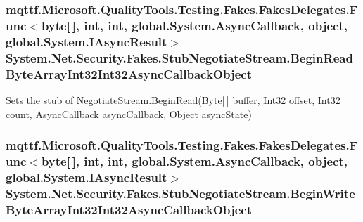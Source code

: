 \hypertarget{class_system_1_1_net_1_1_security_1_1_fakes_1_1_stub_negotiate_stream_a8e59a06ff3bde15658924f7dad554abf}{
\subsubsection[{Begin\-Read\-Byte\-Array\-Int32\-Int32\-Async\-Callback\-Object}]{\setlength{\rightskip}{0pt plus 5cm}mqttf.\-Microsoft.\-Quality\-Tools.\-Testing.\-Fakes.\-Fakes\-Delegates.\-Func$<$byte\mbox{[}$\,$\mbox{]}, int, int, global.\-System.\-Async\-Callback, object, global.\-System.\-I\-Async\-Result$>$ System.\-Net.\-Security.\-Fakes.\-Stub\-Negotiate\-Stream.\-Begin\-Read\-Byte\-Array\-Int32\-Int32\-Async\-Callback\-Object}}\label{class_system_1_1_net_1_1_security_1_1_fakes_1_1_stub_negotiate_stream_a8e59a06ff3bde15658924f7dad554abf}


Sets the stub of Negotiate\-Stream.\-Begin\-Read(\-Byte\mbox{[}$\,$\mbox{]} buffer, Int32 offset, Int32 count, Async\-Callback async\-Callback, Object async\-State)

\hypertarget{class_system_1_1_net_1_1_security_1_1_fakes_1_1_stub_negotiate_stream_a3238f8207d6ca029c1700f0e0894dd2c}{
\subsubsection[{Begin\-Write\-Byte\-Array\-Int32\-Int32\-Async\-Callback\-Object}]{\setlength{\rightskip}{0pt plus 5cm}mqttf.\-Microsoft.\-Quality\-Tools.\-Testing.\-Fakes.\-Fakes\-Delegates.\-Func$<$byte\mbox{[}$\,$\mbox{]}, int, int, global.\-System.\-Async\-Callback, object, global.\-System.\-I\-Async\-Result$>$ System.\-Net.\-Security.\-Fakes.\-Stub\-Negotiate\-Stream.\-Begin\-Write\-Byte\-Array\-Int32\-Int32\-Async\-Callback\-Object}}\label{class_system_1_1_net_1_1_security_1_1_fakes_1_1_stub_negotiate_stream_a3238f8207d6ca029c1700f0e0894dd2c}


